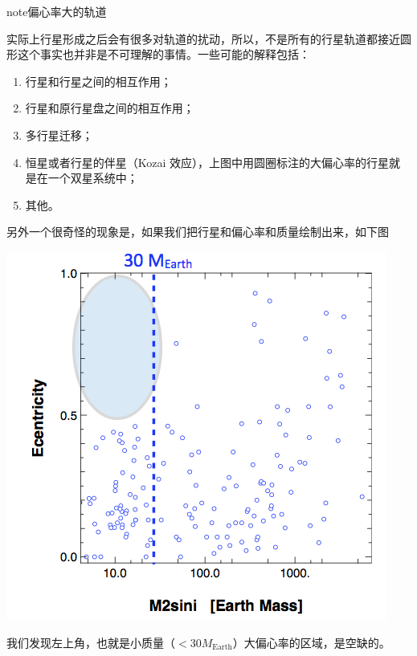 \documentclass[letterpaper,10pt,english]{sphinxmanual}
\begin{document}
\begin{notice}{note}{偏心率大的轨道}

实际上行星形成之后会有很多对轨道的扰动，所以，不是所有的行星轨道都接近圆形这个事实也并非是不可理解的事情。一些可能的解释包括：
\begin{enumerate}
\item {} 
行星和行星之间的相互作用；

\item {} 
行星和原行星盘之间的相互作用；

\item {} 
多行星迁移；

\item {} 
恒星或者行星的伴星（Kozai 效应），上图中用圆圈标注的大偏心率的行星就是在一个双星系统中；

\item {} 
其他。

\end{enumerate}

另外一个很奇怪的现象是，如果我们把行星和偏心率和质量绘制出来，如下图

{\hfill\includegraphics{eVmass.png}\hfill}
\end{notice}

我们发现左上角，也就是小质量（\(<30M_{\text{Earth}}\)）大偏心率的区域，是空缺的。
\end{document}
